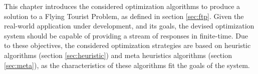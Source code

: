 This chapter introduces the considered optimization algorithms to produce a solution to a Flying Tourist Problem, as defined in section \ref{sec:ftp}. 
Given the real-world application under development, and its goals, the devised optimization system should be capable of providing a stream of responses in finite-time. Due to these objectives, the considered optimization strategies are based on heuristic algorithms (section \ref{sec:heuristic}) and meta heuristics algorithms (section \ref{sec:meta}), as the characteristics of these algorithms fit the goals of the system.



